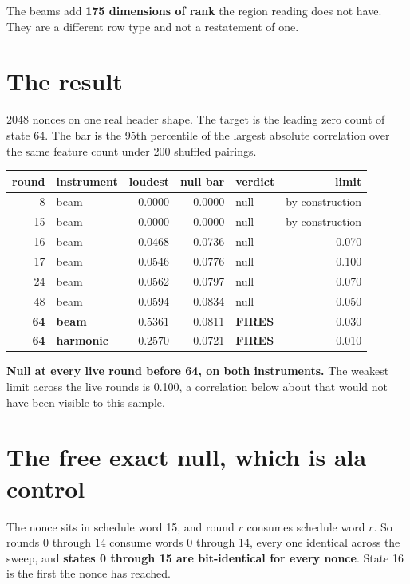 The beams add \textbf{175 dimensions of rank} the region reading does not have. They are a different
row type and not a restatement of one.

\section{The result}

2048 nonces on one real header shape. The target is the leading zero count of state 64. The bar is
the 95th percentile of the largest absolute correlation over the same feature count under 200
shuffled pairings.

\begin{center}
\begin{tabular}{rlrrlr}
\toprule
round & instrument & loudest & null bar & verdict & limit \\
\midrule
8 & beam & 0.0000 & 0.0000 & null & by construction \\
15 & beam & 0.0000 & 0.0000 & null & by construction \\
16 & beam & 0.0468 & 0.0736 & null & 0.070 \\
17 & beam & 0.0546 & 0.0776 & null & 0.100 \\
24 & beam & 0.0562 & 0.0797 & null & 0.070 \\
48 & beam & 0.0594 & 0.0834 & null & 0.050 \\
\textbf{64} & \textbf{beam} & \(\mathbf{0.5361}\) & 0.0811 & \textbf{FIRES} & 0.030 \\
\textbf{64} & \textbf{harmonic} & \(\mathbf{0.2570}\) & 0.0721 & \textbf{FIRES} & 0.010 \\
\bottomrule
\end{tabular}
\end{center}

\textbf{Null at every live round before 64, on both instruments.} The weakest limit across the live
rounds is 0.100, a correlation below about that would not have been visible to this sample.

\section{The free exact null, which is ala control}

The nonce sits in schedule word 15, and round \(r\) consumes schedule word \(r\). So rounds 0 through
14 consume words 0 through 14, every one identical across the sweep, and \textbf{states 0 through 15
are bit-identical for every nonce}. State 16 is the first the nonce has reached.

